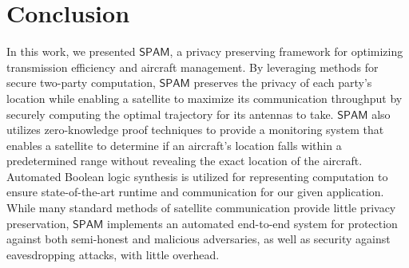 \documentclass[9pt,sigconf,screen]{acmart}
\newcommand{\nojan}[1]{\textcolor{red}{{\sf (NS:} {\sl{#1})}}}
\newcommand\sys{$\mathsf{SPAM}$\xspace}
\begin{document}
\section{Conclusion}
In this work, we presented \sys, a privacy preserving framework for optimizing transmission efficiency and aircraft management. By leveraging methods for secure two-party computation, \sys preserves the privacy of each party's location while enabling a satellite to maximize its communication throughput by securely computing the optimal trajectory for its antennas to take. \sys also utilizes zero-knowledge proof techniques to provide a monitoring system that enables a satellite to determine if an aircraft's location falls within a predetermined range without revealing the exact location of the aircraft. Automated Boolean logic synthesis is utilized for representing computation to ensure state-of-the-art runtime and communication for our given application. While many standard methods of satellite communication provide little privacy preservation, \sys implements an automated end-to-end system for protection against both semi-honest and malicious adversaries, as well as security against eavesdropping attacks, with little overhead. 




\end{document}
